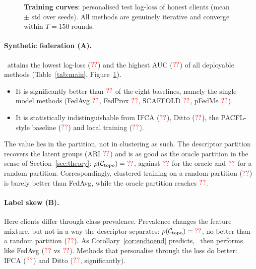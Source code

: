\begin{figure}[t]
\centering
{}
\caption{\textbf{Training curves}: personalised test log-loss of honest clients (mean $\pm$
std over seeds). All methods are genuinely iterative and converge within $T=150$ rounds.}
\label{fig:curves}
\end{figure}

\paragraph{Synthetic federation (A).}
\ptopofl\ attains the lowest log-loss ($\textcolor{red}{??}$) and the highest AUC
($\textcolor{red}{??}$) of all deployable methods (Table~\ref{tab:main}, Figure~\ref{fig:curves}).
\begin{itemize}[leftmargin=1.2em,itemsep=2pt]
  \item It is significantly better than $\textcolor{red}{??}$ of the eight baselines, namely the
    single-model methods (FedAvg $\textcolor{red}{??}$, FedProx $\textcolor{red}{??}$, SCAFFOLD
    $\textcolor{red}{??}$, pFedMe $\textcolor{red}{??}$).
  \item It is statistically indistinguishable from IFCA ($\textcolor{red}{??}$), Ditto
    ($\textcolor{red}{??}$), the PACFL-style baseline ($\textcolor{red}{??}$) and local training
    ($\textcolor{red}{??}$).
\end{itemize}
The value lies in the partition, not in clustering as such. The descriptor partition
recovers the latent groups (ARI $\textcolor{red}{??}$) and is as good as the oracle partition in the
sense of Section~\ref{sec:theory}: $\rho(\mathcal{C}_{\mathrm{topo}})=\textcolor{red}{??}$, against
$\textcolor{red}{??}$ for the oracle and $\textcolor{red}{??}$ for a random partition. Correspondingly,
clustered training on a random partition ($\textcolor{red}{??}$) is barely better than FedAvg,
while the oracle partition reaches $\textcolor{red}{??}$.

\paragraph{Label skew (B).}
Here clients differ through class prevalence. Prevalence changes the feature mixture, but
not in a way the descriptor separates:
$\rho(\mathcal{C}_{\mathrm{topo}})=\textcolor{red}{??}$, no better than a random partition
($\textcolor{red}{??}$). As Corollary~\ref{cor:endtoend} predicts, \ptopofl\ then performs like
FedAvg ($\textcolor{red}{??}$ vs $\textcolor{red}{??}$). Methods that personalise through the loss do
better: IFCA ($\textcolor{red}{??}$) and Ditto ($\textcolor{red}{??}$, significantly).

